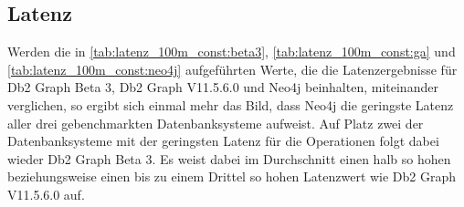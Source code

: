 \subsection{Latenz}
Werden die in \autoref{tab:latenz_100m_const:beta3}, \ref{tab:latenz_100m_const:ga} und \ref{tab:latenz_100m_const:neo4j} aufgeführten Werte, die die Latenzergebnisse für Db2 Graph Beta 3, Db2 Graph V11.5.6.0 und Neo4j beinhalten, miteinander verglichen, so ergibt sich einmal mehr das Bild, dass Neo4j die geringste Latenz aller drei gebenchmarkten Datenbanksysteme aufweist. Auf Platz zwei der Datenbanksysteme mit der geringsten Latenz für die Operationen folgt dabei wieder Db2 Graph Beta 3. Es weist dabei im Durchschnitt einen halb so hohen beziehungsweise einen bis zu einem Drittel so hohen Latenzwert wie Db2 Graph V11.5.6.0 auf.

\begin{table}[!ht]
\centering
{}
\caption{Latenz Linkbench-Const-100M Db2 Graph Beta 3}
\label{tab:latenz_100m_const:beta3}
\end{table}

